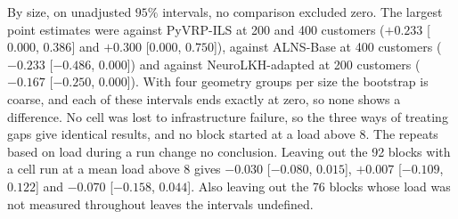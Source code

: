 \documentclass{ieeeaccess}
\begin{document}
By size, on unadjusted $95\%$ intervals, no comparison excluded zero. The largest point estimates were against PyVRP-ILS at 200 and 400 customers ($+0.233$ [$0.000$, $0.386$] and $+0.300$ [$0.000$, $0.750$]), against ALNS-Base at 400 customers ($-0.233$ [$-0.486$, $0.000$]) and against NeuroLKH-adapted at 200 customers ($-0.167$ [$-0.250$, $0.000$]). With four geometry groups per size the bootstrap is coarse, and each of these intervals ends exactly at zero, so none shows a difference. No cell was lost to infrastructure failure, so the three ways of treating gaps give identical results, and no block started at a load above 8. The repeats based on load during a run change no conclusion. Leaving out the 92 blocks with a cell run at a mean load above 8 gives $-0.030$ [$-0.080$, $0.015$], $+0.007$ [$-0.109$, $0.122$] and $-0.070$ [$-0.158$, $0.044$]. Also leaving out the 76 blocks whose load was not measured throughout leaves the intervals undefined.
\end{document}
